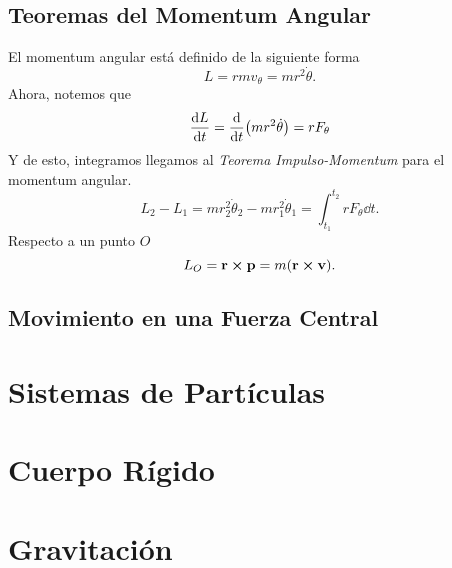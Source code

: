 \section{Teoremas del Momentum Angular}
El momentum angular está definido de la siguiente forma
\begin{equation}
L = rmv_\theta = mr^2 \dot{\theta}.
\end{equation}
Ahora, notemos que 
\begin{equation}
	\dv{L}{t} = \dv{t} (mr^2 \dot{\theta}) = rF_\theta
\end{equation}
Y de esto, integramos llegamos al \textit{Teorema Impulso-Momentum} para el momentum angular.
\begin{equation}
	L_2 - L_1 = mr_2 ^2 \dot{\theta} _2 - mr_1 ^2 \dot{\theta} _1 = \int _{t_1} ^{t_2} rF_\theta \dd{t}.
\end{equation}
Respecto a un punto $O$
\begin{equation}
	L_O = \vb{r} \cp \vb{p} = m\qty(\vb{r} \cp \vb{v}).
\end{equation}


\section{Movimiento en una Fuerza Central}










\chapter{Sistemas de Partículas}












\chapter{Cuerpo Rígido}












\chapter{Gravitación}













